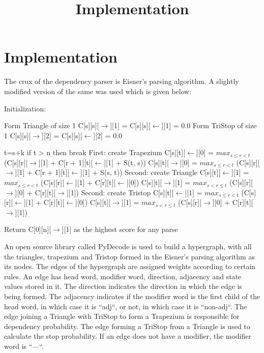 \documentclass{article}
\title{Implementation}
\begin{document}
\maketitle{}

\date{}

\section{Implementation}

The crux of the dependency parser is Eisner's parsing algorithm. A slightly modified version of the same was used which is given below:


\begin{algorithm}
\begin{algorithmic}
  \State Initialization:

        Form Triangle of size 1
        \State C[s][s][$\rightarrow$][1] = C[s][s][$\leftarrow$][1] = 0.0
        Form TriStop of size 1
        \State C[s][s][$\rightarrow$][2] = C[s][s][$\leftarrow$][2] = 0.0
\EndFor




    \State t=s+k
     \State if t > n then break
     \State First: create Trapezium
      \State C[s][t][$\leftarrow$][0] = $max_{s \le r< t}$ (C[s][r][$\rightarrow$][1] + C[r + 1][t][$\leftarrow$][1] + S(t, s)) 
      \State C[s][t][$\rightarrow$][0] = $max_{s \le r<t}$ (C[s][r][$\rightarrow$][1] + C[r + 1][t][$\leftarrow$][1] + S(s, t)) 
      \State Second: create Triangle
      \State C[s][t][$\leftarrow$][1] = $max_{s \le r<t}$ (C[s][r][$\leftarrow$][1] + C[r][t][$\leftarrow$][0])
      \State C[s][t][$\rightarrow$][1] = $max_{s<r \le t}$ (C[s][r][$\rightarrow$][0] + C[r][t][$\rightarrow$][1])
      \State Second: create Tristop
      \State C[s][t][$\leftarrow$][1] = $max_{s \le r<t}$ (C[s][r][$\leftarrow$][1] + C[r][t][$\leftarrow$][0])
      \State C[s][t][$\rightarrow$][1] = $max_{s<r \le t}$ (C[s][r][$\rightarrow$][0] + C[r][t][$\rightarrow$][1])


\EndFor
\EndFor

      \State Return C[0][n][$\rightarrow$][1] as the highest score for any parse \\

\end{algorithmic}
\end{algorithm}


An open source library called PyDecode is used to build a hypergraph, with all the triangles, trapezium and Tristop formed in the Eisner's parsing algorithm as its nodes. The edges of the hypergraph are assigned weights according to certain rules. An edge has head word, modifier word, direction, adjacency and state values stored in it. The direction indicates the direction in which the edge is being formed. The adjacency indicates if the modifier word is the first child of the head word, in which case it is ``adj``, or not, in which case it is ``non-adj``. The edge joining a Triangle with TriStop to form a Trapezium is responsible for dependency probability. The edge forming a TriStop from a Triangle is used to calculate the stop probability. If an edge does not have a modifier, the modifier word is ``---``.
\end{document}
